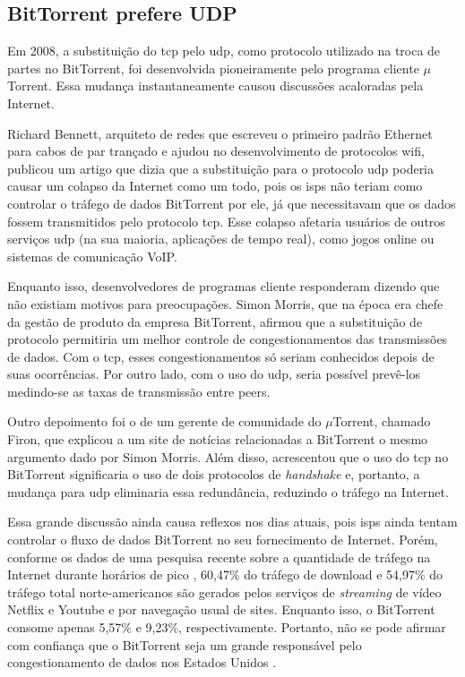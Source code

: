 
\subsection*{BitTorrent prefere UDP}

Em 2008, a substituição do \gls*{tcp} pelo \gls*{udp}, como protocolo utilizado na
troca de partes no BitTorrent, foi desenvolvida pioneiramente pelo programa cliente
$\mu$Torrent. Essa mudança instantaneamente causou discussões acaloradas pela Internet.

Richard Bennett, arquiteto de redes que escreveu o primeiro padrão Ethernet para cabos
de par trançado e ajudou no desenvolvimento de protocolos wifi, publicou um artigo
\cite{site:register-bennett} que dizia que a substituição para o protocolo \gls*{udp}
poderia causar um colapso da Internet como um todo, pois os \glspl{isp} não teriam como
controlar o tráfego de dados BitTorrent por ele, já que necessitavam que os dados
fossem transmitidos pelo protocolo \gls*{tcp}. Esse colapso afetaria usuários de outros
serviços \gls*{udp} (na sua maioria, aplicações de tempo real), como jogos online ou
sistemas de comunicação VoIP.

Enquanto isso, desenvolvedores de programas cliente responderam dizendo que não existiam
motivos para preocupações. Simon Morris, que na época era chefe da gestão de produto da
empresa BitTorrent, afirmou \cite{site:dslreports-bennett} que a substituição de
protocolo permitiria um melhor controle de congestionamentos das transmissões de dados.
Com o \gls*{tcp}, esses congestionamentos só seriam conhecidos depois de suas
ocorrências. Por outro lado, com o uso do \gls*{udp}, seria possível prevê-los
medindo-se as taxas de transmissão entre \glspl*{peer}.

Outro depoimento foi o de um gerente de comunidade do $\mu$Torrent, chamado Firon, que
explicou a um site de notícias relacionadas a BitTorrent
\cite{site:torrentfreak-bennett} o mesmo argumento dado por Simon Morris. Além disso,
acrescentou que o uso do \gls*{tcp} no BitTorrent significaria o uso de dois protocolos
de \emph{handshake} e, portanto, a mudança para \gls*{udp} eliminaria essa redundância,
reduzindo o tráfego na Internet.

Essa grande discussão ainda causa reflexos nos dias atuais, pois \glspl*{isp} ainda
tentam controlar o fluxo de dados BitTorrent no seu fornecimento de Internet. Porém,
conforme os dados de uma pesquisa recente sobre a quantidade de
tráfego na Internet durante horários de pico \cite{report:internet-usage-2013},
60,47\% do tráfego de download e 54,97\% do tráfego total norte-americanos são gerados
pelos serviços de \emph{streaming} de vídeo Netflix e Youtube e por navegação usual de
sites. Enquanto isso, o BitTorrent consome apenas 5,57\% e 9,23\%, respectivamente.
Portanto, não se pode afirmar com confiança que o BitTorrent seja um grande responsável
pelo congestionamento de dados nos Estados Unidos
\cite{site:theguardian-bittorrentvsnetflix}.

